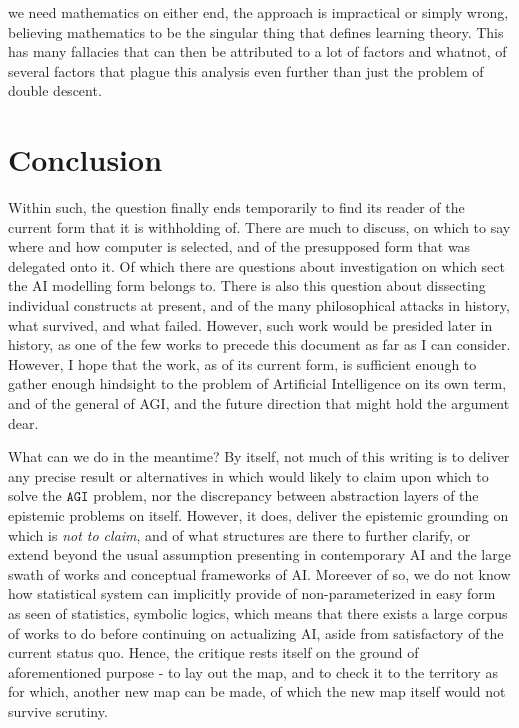 we need mathematics on either end, the approach is impractical or simply wrong, believing mathematics to be the singular thing that defines learning theory. This has many fallacies that can then be attributed to a lot of factors and whatnot, of several factors that plague this analysis even further than just the problem of double descent.


\section{Conclusion}

Within such, the question finally ends temporarily to find its reader of the current form that it is withholding of. There are much to discuss, on which to say where and how computer is selected, and of the presupposed form that was delegated onto it. Of which there are questions about investigation on which sect the AI modelling form belongs to. There is also this question about dissecting individual constructs at present, and of the many philosophical attacks in history, what survived, and what failed. However, such work would be presided later in history, as one of the few works to precede this document as far as I can consider. However, I hope that the work, as of its current form, is sufficient enough to gather enough hindsight to the problem of Artificial Intelligence on its own term, and of the general of AGI, and the future direction that might hold the argument dear. 

What can we do in the meantime? By itself, not much of this writing is to deliver any precise result or alternatives in which would likely to claim upon which to solve the $\texttt{AGI}$ problem, nor the discrepancy between abstraction layers of the epistemic problems on itself. However, it does, deliver the epistemic grounding on which is \textit{not to claim}, and of what structures are there to further clarify, or extend beyond the usual assumption presenting in contemporary AI and the large swath of works and conceptual frameworks of AI. Moreever of so, we do not know how statistical system can implicitly provide of non-parameterized in easy form as seen of statistics, symbolic logics, which means that there exists a large corpus of works to do before continuing on actualizing AI, aside from satisfactory of the current status quo. Hence, the critique rests itself on the ground of aforementioned purpose - to lay out the map, and to check it to the territory as for which, another new map can be made, of which the new map itself would not survive scrutiny. 

